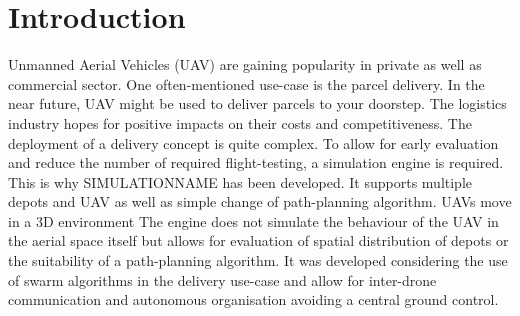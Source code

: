 \section{Introduction}
Unmanned Aerial Vehicles (UAV) are gaining popularity in private as well as commercial sector. One often-mentioned use-case is the parcel delivery. In the near future, UAV might be used to deliver parcels to your doorstep. The logistics industry hopes for positive impacts on their costs and competitiveness. The deployment of a delivery concept is quite complex. To allow for early evaluation and reduce the number of required flight-testing, a simulation engine is required. This is why SIMULATIONNAME has been developed. It supports multiple depots and UAV as well as  simple change of path-planning algorithm. UAVs move in a 3D environment  The engine does not simulate the behaviour of the UAV in the aerial space itself but allows for evaluation of spatial distribution of depots or the suitability of a path-planning algorithm. It was developed considering the use of swarm algorithms in the delivery use-case and allow for inter-drone communication and autonomous organisation avoiding a central ground control.


